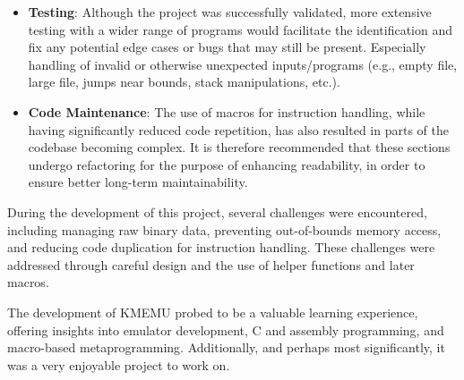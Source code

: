 \documentclass[10pt,a4paper,final]{article}
\begin{document}
\begin{itemize}
    \item \textbf{Testing}: Although the project was successfully validated,
        more extensive testing with a wider range of programs would facilitate
        the identification and fix any potential edge cases or bugs that may
        still be present. Especially handling of invalid or otherwise unexpected
        inputs/programs (e.g., empty file, large file, jumps near bounds, stack
        manipulations, etc.).
    \item \textbf{Code Maintenance}: The use of macros for instruction handling,
        while having significantly reduced code repetition, has also resulted in
        parts of the codebase becoming complex. It is therefore recommended that
        these sections undergo refactoring for the purpose of enhancing
        readability, in order to ensure better long-term maintainability.
\end{itemize}

During the development of this project, several challenges were encountered,
including managing raw binary data, preventing out-of-bounds memory access, and
reducing code duplication for instruction handling. These challenges were
addressed through careful design and the use of helper functions and later
macros.

The development of KMEMU probed to be a valuable learning experience, offering
insights into emulator development, C and assembly programming, and macro-based
metaprogramming. Additionally, and perhaps most significantly, it was a very
enjoyable project to work on.
\end{document}
